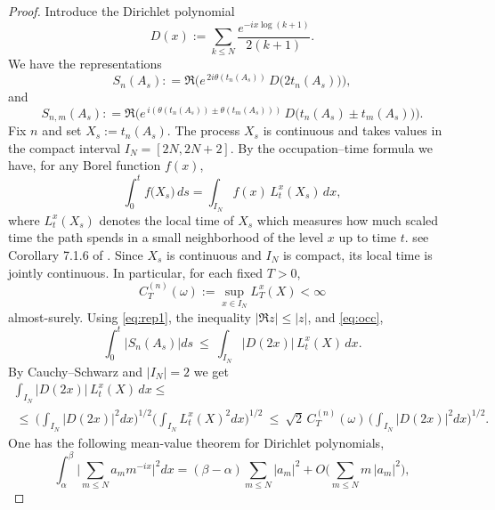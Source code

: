 \documentclass[12pt,reqno]{amsart}
\theoremstyle{plain}
\theoremstyle{definition}
\theoremstyle{remark}
\begin{document}
\begin{proof}
Introduce the Dirichlet polynomial
\begin{equation}\label{eq:S}
D(x):=\sum_{k\le N}\frac{e^{-ix\log(k+1)}}{2(k+1)} .
\end{equation}
We have the representations
\begin{equation}\label{eq:rep1}
S_n(A_s):
=\Re \Big(e^{\,2i\theta(t_n(A_s))}\,D \bigl(2t_n(A_s)\bigr)\Big),
\end{equation}
and
\begin{equation}\label{eq:rep2}
S_{n,m}(A_s):
=\Re \Big(e^{\,i(\theta(t_n(A_s))\pm\theta(t_m(A_s)))}\,D \bigl(t_n(A_s)\pm t_m(A_s)\bigr)\Big) .
\end{equation}
Fix $n$ and set $X_s:=t_n(A_s)$. The process $X_s$ is continuous and takes values
in the compact interval $I_N=[2N,2N+2]$. By the occupation–time formula we have, for any Borel function $f(x)$,
\begin{equation}\label{eq:occ}
\int_0^t f\!\bigl(X_s\bigr)\,ds=\int_{I_N} f(x)\,L_t^x(X_s)\,dx ,
\end{equation}
where $L_t^x(X_s)$ denotes the local time of $X_s$ which measures how much scaled time the path spends in a small neighborhood of the level $x$ up to time $t$. see Corollary 7.1.6 of \cite{RY}. 
Since $X_s$ is
continuous and $I_N$ is compact, its local time is jointly continuous. In
particular, for each fixed $T>0$,
\begin{equation}\label{eq:LTsup}
C_T^{(n)}(\omega):=\sup_{x\in I_N}L_T^x(X)<\infty
\end{equation}
almost-surely. Using \eqref{eq:rep1}, the inequality $|\Re z|\le|z|$, and \eqref{eq:occ},
\begin{equation}
\int_0^t \left| S_n(A_s) \right| ds
\ \le\ \int_{I_N} |D(2x)|\,L_t^x(X)\,dx .
\end{equation}
By Cauchy–Schwarz and $|I_N|=2$ we get 
\begin{multline}\label{eq:CS1}
\int_{I_N} |D(2x)|\,L_t^x(X)\,dx
\le \\ \ \le\ \Big(\!\int_{I_N}|D(2x)|^2 dx\Big)^{1/2}
      \Big(\!\int_{I_N}L_t^x(X)^2 dx\Big)^{1/2}
\ \le\ \sqrt{2}\,C_T^{(n)}(\omega)\,\Big(\!\int_{I_N}|D(2x)|^2 dx\Big)^{1/2}.
\end{multline}
One has the following mean-value theorem for Dirichlet polynomials,
\begin{equation}\label{eq:ivic}
\int_{\alpha}^{\beta} \Big|\sum_{m\le N}a_m m^{-ix}\Big|^2 dx
= (\beta - \alpha) \sum_{m\le N}|a_m|^2 + O \Big(\sum_{m\le N} m\,|a_m|^2\Big),

\end{equation}
\end{proof}
\end{document}
